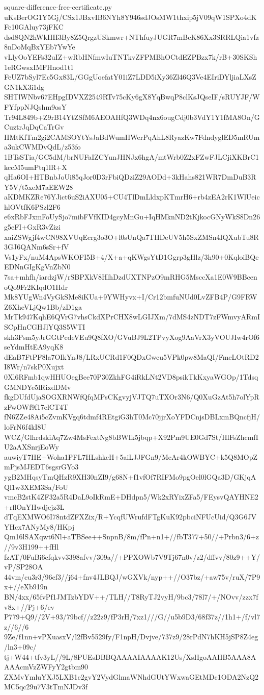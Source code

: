\documentclass[11pt]{article}
\theoremstyle{definition}
\theoremstyle{remark}
\begin{document}
\begin{filecontents*}[overwrite]{square-difference-free-certificate.py}
uKsBerOG1Y5Gj/CSx1JBxvIB6NYh8Y946sdJOsMW1thxip5jV09qW1SPXo4dKFc10GAluy73jFKC
dsd8QN2hWkHH3By8Z5QrgzUSkmwr+NThfuyJUGR7mBcK86Xx3SRRLQia1vfz8nDoMqBxYEb7YwYe
vLlyOoYEFs32uIZ+wRbHNfmwIuTNTkvZFPMBhOCtdEZPBzx7k/rB+30SKSh1eRGwsxIMFHnod1t1
FeUZ7bSyl7Ec5Gx83L/GGgUoefatY01iZ7LDD5iXy36Zl46Q3Ve4EIriDYljiaLXsZGN1kX3i1dg
SHTlWNbv67EHpgIDVXZ2549RTv75cKy6gX8YqBwqP8clKsJQseIF/sRUYJF/WFYfppNJQshm9osY
Tr94L849b+Z9rB14YtZSfM6AEOAHfQ3WDq4nx6ougCdj0b3VdY1Y1fMA8On/GCuztrJqDqCaTrGv
HMtKfTm2gi2CAMSOYtYsJaBdWumHWerPqAhL8RyazKw7FdndyglED5mRUma3ukCWMDvQdL/z53fo
1BTsSTia/GC5dM/brNUFaIZCYunJHNJx6hgA/mtWrb0Z2xFZwFJLCjiXKBrC1kccM5umPtq1lR+X
qHa6OI+HTBnbJoUi85qJor0D3rFbiQDziZ29AODd+3kHahs821WR7DmDuB3RY5V/t5xeM7aEEW28
aKDMKZRe76YJict6uS2iAXU05+CU4TlDmLldxpKTmrH6+rb4zEA2rK1WlUeichlOVtfK6PSzl2F6
e6xRbFJxmFoUySjo7mibFVfKID4gcyMnGu+IqHMknND2tKjkocGNyWkS8Dn26g5eFI+GxR3vZizi
xaiZSWgjf4wCN98XVUqEcrg3o3O+l0sUnQa7THDeUV5h5SxZMSn4IQXubTu8R3GJ6QANm6sSr+fV
Vs1yFx/nuM4ApsWKOFI5B+4/X+a+qKWgsYtD1Ggrp3gHlz/3h90+0KqloiBQeEDNnGIgKgVnZbN0
7sa+mhfh/iardzjW/rSBPXkV8HlhDzdUXTNPzO9mRHG5MsccXa1E0W9BBcenoQo9Fr2KIqdO1Hdr
Mk8YUgWn4VyGkSMe8iKUa+9YWHyvx+I/Cr12bmfuNUd0LvZFB4P/G9FRWZ6XheVLjQw1Bb/zD1ga
MrTk947KqhE6QVrG7vhsCkdXPrCHX8wLGIJXm/7dMS4zNDT7zFWmvyARmISCpHnCGHJlYQ3S5WTI
skh3Psm5yJrGGtPcdeVEu9Q8fXO/GVuBJ9L2TPvyXog9AaVrX3yVOUJIw4rOf6seYdmHtEA9yqK8
dEaB7FtPF8la7OIkYnJ8/LRxUCRd1F0QDxGwcu5VPk0pw8MaQI/FmcLOtRD2I8Wr/n7skP0Xujxt
0Xl6RFmb1qwHHUOegBee70P30ZkhFG4iRkLNt2VD8psikTkKxyaWGOp/1TdsqGMNDYe5lRixdDMv
fkgDUfdUjaSOGXRNWfQfqMPsCKgvyjVJTQ7uTXOr3N6/Q0XuGzAt5h7olYpRzFwOWf9f17elCT4T
fN6ZZe48Ai5cZvmKVgq6tdmf4REtgiG3hT0Mc70jjrXoYFDCnjsDBLxmBQncfjH/loFrN6f4kI8U
WCZ/GlhrdskiAq7Zw4MsFextNg8bBWIk5jbqp+X92Pm9UE0Gd7St/HlFsZhcmfIU2aAXSnrjEoWy
auwiyT7HE+Woha1PFL7HLshkcH+5aiLJJFGn9/MeAr4kOWBYC+k5Q8MOpZmPjsMJEDT6sgsrGYo3
ygB2MHqsyTmQHzR9XH30nZI9/g68N+f1vfOf7RIFMo9pgOel0lGQa3D/GKjqAQl1w3XEM3Sa/FoU
vmcB2stK4ZF32a5R4DaL9oIkRmE+DHdpn5/Wk2xRYixZFa5/FEysvQAYHNE2+rflOnYHwdjejz3L
dTqEXMWO6I78ntdZFXZix/R+YcqfUWrufdFTgKuK92pbciNFUcUid/Q3G6JVYHcx7ANyMy8/HKpj
Qm16lSAXqwt6Nl+aTBSee++SnpnB/8m/fPn+n1+//fbT377+50//+Prbn3/6+z//9v3H199++fHl
fzAT/0FuBi6cfqkvv3398afvv/309a//+PPXOWb7V9Tj67n0v/z2/dffvv/80z9++Y/vP/SP28OA
44vm/cu3r3/96cf3//j64+fnv4JLBQJ/wGXVk/nyp++//O37bz/+aw75v/ruX/7P9x+//eXb919n
BN/4xx/65fvPf1JMTzbYDV++/TLH//T8RyTJ2vyH/9bc3/78l7/+/NOvv/zzx7fv8x+//Pj+6/ev
P779+Q9//2V+93/79bcf//z22z9/fP3rH/7xz1///G//u5b9D3/68f37z//1h1+/f/vl7z//6//6
9Ze/f1nn+vPXuasxV/l2fBv5529fy/F1npH/Dvjve/737z9/28rPdN7hKH5jSP8Z4eg/ln3+09c/
tj+W44+tfv3yL//9L/8PUEsDBBQAAAAIAAAAK12Us/XsHgoAAHB5AAA8AAAAcmVzZWFyY2gtbm90
ZXMvYmluYXJ5LXB1c2gvY2VydGlmaWNhdGUtYWxwaGEtMDc1ODA2NzQ2MC5qc29u7V3tTmNJDv3f

\end{filecontents*}
\end{document}
